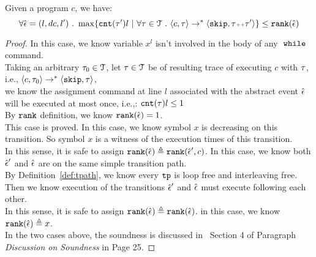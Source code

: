   \begin{lem}
    \label{lem:local_bound_sound}
  Given a program ${c}$, we have:
  \[
  \forall \absevent = (l, dc, l') \st 
  \max \left\{ \counter(\vtrace') l ~ \middle\vert~
  \forall \vtrace \in \mathcal{T} \st \config{{c}, \trace} \to^{*} \config{\eskip, \trace\tracecat\vtrace'} \right\} 
  \leq 
  \locbound(\absevent)
  \]
  \end{lem}
  \begin{proof}
    In this case, we know variable $x^l$ isn't involved in the body of any $\;\mathtt{while}\;$ command. 
    \\
    Taking an arbitrary $\mathtt{\tau}_0 \in \mathcal{T}$, 
    let $\mathtt{\tau} \in \mathcal{T}$ be of resulting trace of executing $c$ with $\mathtt{\tau}$, 
    i.e., $\langle {c}, \mathtt{\tau}_0 \rangle \to^{*} \langle \mathtt{skip}, \mathtt{\tau} \rangle$,
    \\
    we know the
    assignment command at line $l$ associated with the abstract event $\hat{\mathtt{\epsilon}{}}$ will be executed at most once, i.e.,:
    $\mathtt{cnt}(\mathtt{\tau}) l \leq 1$
    \\
    By $\mathtt{rank}$ definition, we know $\mathtt{rank}(\hat{\mathtt{\epsilon}{}}) = 1$.
    \\
    This case is proved.
    In this case, we know symbol $x$ is decreasing on this transition. So symbol $x$ is a witness of the execution times of this transition.
    \\
    In this sense, it is safe to assign 
    $\mathtt{rank}(\hat{\mathtt{\epsilon}{}}) \triangleq \mathtt{rank}(\hat{\mathtt{\epsilon}{}}', c)$.
    In this case, we know both $\hat{\mathtt{\epsilon}{}}'$ and $\hat{\mathtt{\epsilon}{}}$ are on the same simple transition path.
    \\
    By Definition~\ref{def:tpath}, we know every $\mathtt{tp}$ is loop free and interleaving free. Then we know execution of the transitions $\hat{\mathtt{\epsilon}{}}'$ and $\hat{\mathtt{\epsilon}{}}$ must execute following each other.
    \\
    In this sense, it is safe to assign 
    $\mathtt{rank}(\hat{\mathtt{\epsilon}{}}) \triangleq \mathtt{rank}(\hat{\mathtt{\epsilon}{}})$.
      in this case, we know $\mathtt{rank}(\hat{\mathtt{\epsilon}{}}) \triangleq x$.
    \\
    In the two cases above, the soundness is discussed in~\cite{SinnZV17} Section 4 of Paragraph \emph{Discussion on Soundness} in Page 25.
  \end{proof}
